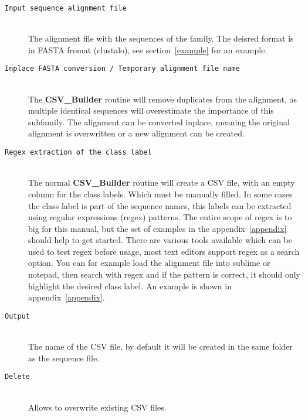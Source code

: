 \documentclass[a4paper,10pt]{article}
\begin{document}
\begin{description}

\item[\texttt{Input sequence alignment file}] \hfill \\
 
The alignment file with the sequences of the family.
The deisred format is in FASTA fromat (clustalo), see section~\ref{example}
for an example.

\item[\texttt{Inplace FASTA conversion / Temporary alignment file name}] \hfill \\
 
The \textbf{CSV\_Builder} routine will remove duplicates from the 
alignment, as multiple identical sequences will overestimate the importance
of this subfamily. The alignment can be converted inplace, meaning
the original alignment is overwritten or a new alignment can be 
created.

\item[\texttt{Regex extraction of the class label}] \hfill \\
 
The normal \textbf{CSV\_Builder} routine will create a CSV file,
with an empty column for the class labels. Which must be manually 
filled.
In some cases the class label is part of the sequence names,
this labels can be extracted using regular expressions (regex) patterns.
The entire scope of regex is to big for this manual, but the set of
examples in the appendix~\ref{appendix} should help to get started. There are various 
tools available which can be used to test regex before usage, most text editors 
support regex as a search option. You can 
for example load the alignment file into sublime or notepad, then
search with regex and if the pattern is correct, it should only highlight 
the desired class label. An example is shown in appendix~\ref{appendix}.

\item[\texttt{Output}] \hfill \\

The name of the CSV file, by default it will be created in the same folder as
the sequence file.

\item[\texttt{Delete}] \hfill \\

Allows to overwrite existing CSV files.

\end{description}
\end{document}
